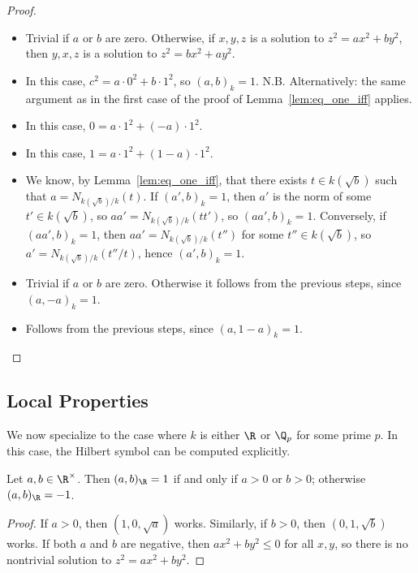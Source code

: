 \begin{proof}
	\leanok

	\begin{itemize}
		\item Trivial if $a$ or $b$ are zero. Otherwise, if $x,y,z$ is a solution to $z^2 = ax^2 + by^2$, then $y,x,z$ is a solution to
	$z^2 = bx^2 + ay^2$.
		\item In this case, $c^2 = a \cdot 0^2 + b \cdot 1^2$, so $(a,b)_k=1$.
		N.B. Alternatively: the same argument as in the first case of the proof of Lemma~\ref{lem:eq_one_iff} applies.
		\item In this case, $0 = a \cdot 1^2 + (-a) \cdot 1^2$.
		\item In this case, $1 = a \cdot 1^2 + (1 - a) \cdot 1^2$.
		\item We know, by Lemma~\ref{lem:eq_one_iff}, that there exists $t \in k(\sqrt{b})$ such that
		$a = N_{k(\sqrt{b})/k}(t)$. If $(a',b)_k=1$, then $a'$ is the norm of some $t' \in k(\sqrt{b})$,
		so $aa' = N_{k(\sqrt{b})/k}(t t')$, so $(aa', b)_k = 1$. Conversely, if $(aa', b)_k = 1$, then
		$aa' = N_{k(\sqrt{b})/k}(t'')$ for some $t'' \in k(\sqrt{b})$, so
		$a' = N_{k(\sqrt{b})/k}(t''/t)$, hence $(a', b)_k = 1$.
		\item Trivial if $a$ or $b$ are zero. Otherwise it follows from the previous steps, since $(a, -a)_k = 1$.
		\item Follows from the previous steps, since $(a, 1 - a)_k = 1$.
	\end{itemize}
\end{proof}
\subsection{Local Properties}
We now specialize to the case where $k$ is either $\R$ or $\Q_p$ for some prime $p$. In this case, the Hilbert symbol can be computed explicitly.

\begin{theorem}
	\label{thm:real}
	\leanok
	Let $a, b \in \R^\times$. Then $(a, b)_{\R} = 1$ if and only if $a > 0$ or $b > 0$; otherwise $(a, b)_{\R} = -1$.
\end{theorem}

\begin{proof}
	If $a>0$, then $(1,0,\sqrt{a})$ works. Similarly, if $b>0$, then $(0,1,\sqrt{b})$ works.
	If both $a$ and $b$ are negative, then $ax^2 + by^2 \le 0$ for all $x,y$, so there is no
	nontrivial solution to $z^2 = ax^2 + by^2$.
\end{proof}

